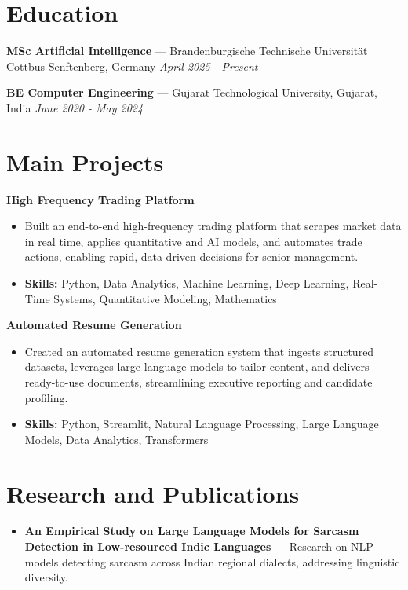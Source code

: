 \documentclass[a4paper,10pt]{article}
\begin{document}
\section*{Education}
\textbf{MSc Artificial Intelligence} — Brandenburgische Technische Universität Cottbus-Senftenberg, Germany \hfill \textit{April 2025 - Present}\par
\vspace{1.5pt}
\textbf{BE Computer Engineering} — Gujarat Technological University, Gujarat, India \hfill \textit{June 2020 - May 2024}\par

\section*{Main Projects}
\textbf{High Frequency Trading Platform}\par
\vspace{1pt}
\begin{itemize}
  \item Built an end-to-end high-frequency trading platform that scrapes market data in real time, applies quantitative and AI models, and automates trade actions, enabling rapid, data-driven decisions for senior management.
  \item \textbf{Skills:} Python, Data Analytics, Machine Learning, Deep Learning, Real-Time Systems, Quantitative Modeling, Mathematics
\end{itemize}
\vspace{3pt}
\textbf{Automated Resume Generation}\par
\vspace{1pt}
\begin{itemize}
  \item Created an automated resume generation system that ingests structured datasets, leverages large language models to tailor content, and delivers ready-to-use documents, streamlining executive reporting and candidate profiling.
  \item \textbf{Skills:} Python, Streamlit, Natural Language Processing, Large Language Models, Data Analytics, Transformers
\end{itemize}

\section*{Research and Publications}
\begin{itemize}
\item \textbf{An Empirical Study on Large Language Models for Sarcasm Detection in Low-resourced Indic Languages} — Research on NLP models detecting sarcasm across Indian regional dialects, addressing linguistic diversity.
\end{itemize}
\end{document}

